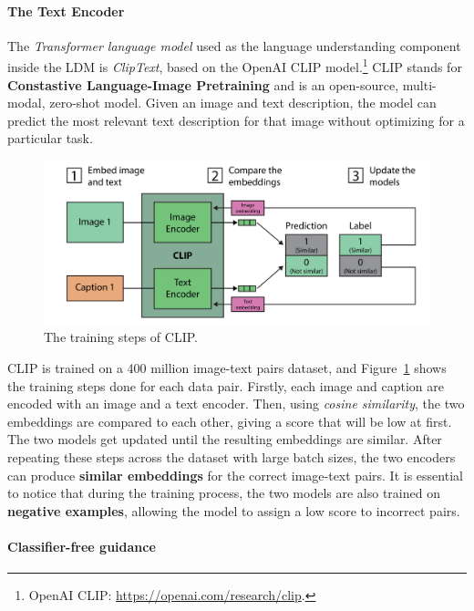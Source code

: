 \documentclass[preprint]{elsarticle}
\begin{document}
\paragraph{The Text Encoder}

The \emph{Transformer language model} used as the language understanding component inside the LDM is \emph{ClipText}, based on the OpenAI CLIP model.\footnote{OpenAI CLIP: \url{https://openai.com/research/clip}.}
CLIP stands for \textbf{Constastive Language-Image Pretraining} and is an open-source, multi-modal, zero-shot model. 
Given an image and text description, the model can predict the most relevant text description for that image without 
optimizing for a particular task.

\begin{figure}[t]
	\centering
    \includegraphics[scale=0.85]{img/svg/Clip.png}
	\caption{The training steps of CLIP.}\label{fig:clip-training}
\end{figure}

CLIP is trained on a 400 million image-text pairs dataset, and Figure~\ref{fig:clip-training} shows the training steps done for each 
data pair.
Firstly, each image and caption are encoded with an image and a text encoder. Then, using \emph{cosine similarity},  the two embeddings are compared to each other, giving a score that will be low at first. 
The two models get updated until the resulting embeddings are similar. 
After repeating these steps across the dataset with large batch sizes, the two encoders can produce \textbf{similar embeddings} 
for the correct image-text pairs. It is essential to notice that during the training process, 
the two models are also trained on \textbf{negative examples}, allowing the model to assign a low score to incorrect pairs.



\paragraph{Classifier-free guidance}
\end{document}
